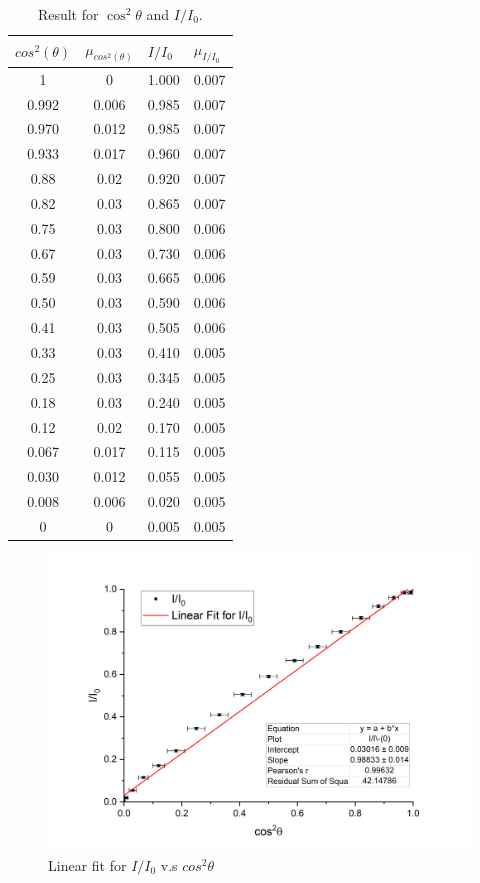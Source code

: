 \documentclass{article}
\begin{document}
\begin{table}[H]
\centering
\begin{tabular}{cccc}
\toprule
\multicolumn{1}{l}{$cos^2(\theta)$} & \multicolumn{1}{l}{$\mu_{cos^2(\theta)}$} & \multicolumn{1}{l}{$I/I_0$} & \multicolumn{1}{l}{$\mu_{I/I_0}$} \\ \midrule
1 & 0 & 1.000 & 0.007 \\
0.992 & 0.006 & 0.985 & 0.007 \\
0.970 & 0.012 & 0.985 & 0.007 \\
0.933 & 0.017 & 0.960 & 0.007 \\
0.88 & 0.02 & 0.920 & 0.007 \\
0.82 & 0.03 & 0.865 & 0.007 \\
0.75 & 0.03 & 0.800 & 0.006 \\
0.67 & 0.03 & 0.730 & 0.006 \\
0.59 & 0.03 & 0.665 & 0.006 \\
0.50 & 0.03 & 0.590 & 0.006 \\
0.41 & 0.03 & 0.505 & 0.006 \\
0.33 & 0.03 & 0.410 & 0.005 \\
0.25 & 0.03 & 0.345 & 0.005 \\
0.18 & 0.03 & 0.240 & 0.005 \\
0.12 & 0.02 & 0.170 & 0.005 \\
0.067 & 0.017 & 0.115 & 0.005 \\
0.030 & 0.012 & 0.055 & 0.005 \\
0.008 & 0.006 & 0.020 & 0.005 \\
0 & 0 & 0.005 & 0.005 \\ \bottomrule
\end{tabular}
\caption{Result for $\cos^2\theta$ and $I/I_0$.}
\label{tab.Malus2}
\end{table}



\begin{figure}[H]
\centering
\includegraphics[scale=0.6]{1}
\caption{Linear fit for $I/I_0$ v.s $cos^2\theta$}\label{fig.cos-I}
\end{figure}
\end{document}
